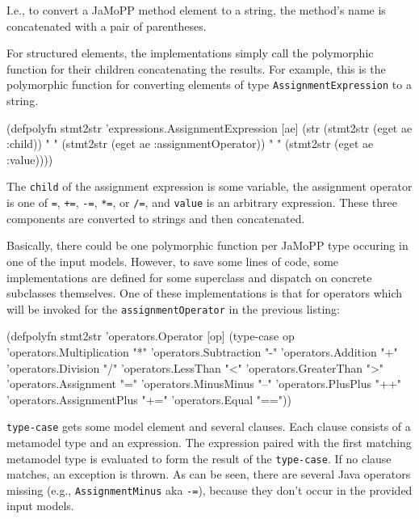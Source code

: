 \documentclass[11pt]{article}
\begin{document}
I.e., to convert a JaMoPP method element to a string, the method's name is
concatenated with a pair of parentheses.

For structured elements, the implementations simply call the polymorphic
function for their children concatenating the results.  For example, this is
the polymorphic function for converting elements of type
\verb|AssignmentExpression| to a string.

\begin{clojurecode}
(defpolyfn stmt2str 'expressions.AssignmentExpression
  [ae]
  (str (stmt2str (eget ae :child)) " "
       (stmt2str (eget ae :assignmentOperator)) " "
       (stmt2str (eget ae :value))))
\end{clojurecode}

The \verb|child| of the assignment expression is some variable, the assignment
operator is one of \verb|=|, \verb|+=|, \verb|-=|, \verb|*=|, or \verb|/=|, and
\verb|value| is an arbitrary expression.  These three components are converted
to strings and then concatenated.

Basically, there could be one polymorphic function per JaMoPP type occuring in
one of the input models.  However, to save some lines of code, some
implementations are defined for some superclass and dispatch on concrete
subclasses themselves.  One of these implementations is that for operators
which will be invoked for the \verb|assignmentOperator| in the previous
listing:

\begin{clojurecode}
(defpolyfn stmt2str 'operators.Operator
  [op]
  (type-case op
    'operators.Multiplication "*"
    'operators.Subtraction    "-"
    'operators.Addition       "+"
    'operators.Division       "/"
    'operators.LessThan       "<"
    'operators.GreaterThan    ">"
    'operators.Assignment     "="
    'operators.MinusMinus     "--"
    'operators.PlusPlus       "++"
    'operators.AssignmentPlus "+="
    'operators.Equal          "=="))
\end{clojurecode}

\verb|type-case| gets some model element and several clauses.  Each clause
consists of a metamodel type and an expression.  The expression paired with the
first matching metamodel type is evaluated to form the result of the
\verb|type-case|.  If no clause matches, an exception is thrown.  As can be
seen, there are several Java operators missing (e.g., \verb|AssignmentMinus|
aka \verb|-=|), because they don't occur in the provided input models.
\end{document}
